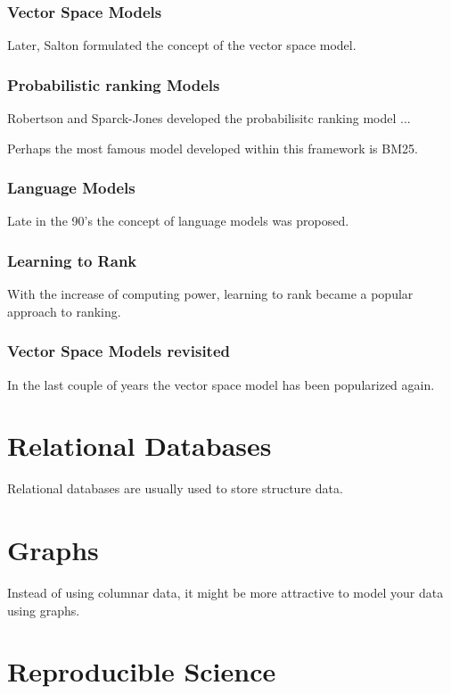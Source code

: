 \subsubsection{Vector Space Models}
Later, Salton formulated the concept of the vector space model. 

\subsubsection{Probabilistic ranking Models}
Robertson and Sparck-Jones developed the probabilisitc ranking model ...

Perhaps the most famous model developed within this framework is BM25. 

\subsubsection{Language Models}
Late in the 90's the concept of language models was proposed. 


\subsubsection{Learning to Rank}
With the increase of computing power, learning to rank became a popular approach to ranking.

\subsubsection{Vector Space Models revisited}
In the last couple of years the vector space model has been popularized again. 

\section{Relational Databases}
Relational databases are usually used to store structure data. 

\section{Graphs}
Instead of using columnar data, it might be more attractive to model your data using graphs. 

\section{Reproducible Science}